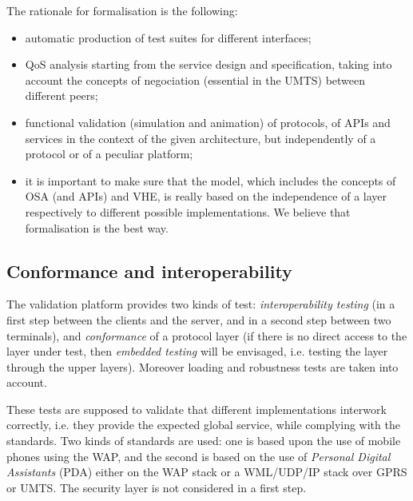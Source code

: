      The rationale for formalisation is the following:

     \begin{itemize}

        \item automatic production of test suites for different
              interfaces;

        \item QoS analysis starting from the service design and
              specification, taking into account the concepts of
              negociation (essential in the UMTS) between different
              peers;

        \item functional validation (simulation and animation) of
              protocols, of APIs and services in the context of the
              given architecture, but independently of a protocol or
              of a peculiar platform;

        \item it is important to make sure that the model, which
              includes the concepts of OSA (and APIs) and VHE, is
              really based on the independence of a layer respectively
              to different possible implementations. We believe
              that formalisation is the best way.

    \end{itemize}
  
  \subsection{Conformance and interoperability\label{validation}}

     The validation platform provides two kinds of test:
     \emph{interoperability testing} (in a first step
     between the clients and the server, and in a second step
     between two terminals), and \emph{conformance} of a protocol
     layer (if there is no direct access to the layer under test, then
     \emph{embedded testing} will be envisaged, i.e. testing the layer
     through the upper layers). Moreover loading and robustness tests
     are taken into account.

     These tests are supposed to validate that different
     implementations interwork correctly, i.e. they provide the
     expected global service, while complying with the standards. Two
     kinds of standards are used: one is based upon the use of mobile
     phones using the WAP, and the second is based on the use of
     \emph{Personal Digital Assistants} (PDA) either on the WAP stack
     or a WML/UDP/IP stack over GPRS or UMTS. The security layer is not
     considered in a first step.

